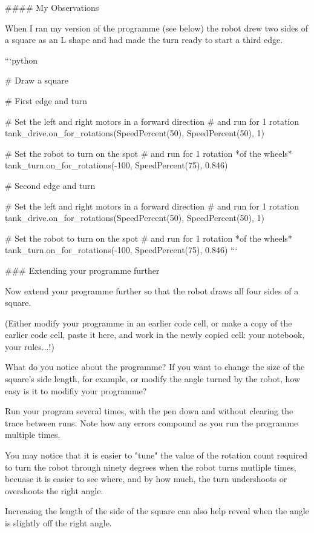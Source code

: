 \documentclass[letterpaper,10pt,english]{sphinxmanual}
\begin{document}
{#### My Observations


When I ran my version of the programme (see below) the robot drew two sides of a square as an L shape and had made the turn ready to start a third edge.

```python

# Draw a square


# First edge and turn

# Set the left and right motors in a forward direction
# and run for 1 rotation
tank_drive.on_for_rotations(SpeedPercent(50), SpeedPercent(50), 1)

# Set the robot to turn on the spot
# and run for 1 rotation *of the wheels*
tank_turn.on_for_rotations(-100, SpeedPercent(75), 0.846)



# Second edge and turn

# Set the left and right motors in a forward direction
# and run for 1 rotation
tank_drive.on_for_rotations(SpeedPercent(50), SpeedPercent(50), 1)


# Set the robot to turn on the spot
# and run for 1 rotation *of the wheels*
tank_turn.on_for_rotations(-100, SpeedPercent(75), 0.846)
```

### Extending your programme further

Now extend your programme further so that the robot draws all four sides of a square.

(Either modify your programme in an earlier code cell, or make a copy of the earlier code cell, paste it here, and work in the newly copied cell: your notebook, your rules...!)

What do you notice about the programme? If you want to change the size of the square's side length, for example, or modify the angle turned by the robot, how easy is it to modifiy your programme?


Run your program several times, with the pen down and without clearing the trace between runs. Note how any errors compound as you run the programme multiple times.

You may notice that it is easier to "tune" the value of the rotation count required to turn the robot through ninety degrees when the robot turns mutliple times, becuase it is easier to see where, and by how much, the turn undershoots or overshoots the right angle.

Increasing the length of the side of the square can also help reveal when the angle is slightly off the right angle.


}
\end{document}
